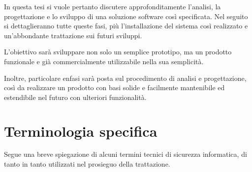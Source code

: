 In questa tesi si vuole pertanto discutere approfonditamente l'analisi, la progettazione e lo sviluppo di una soluzione software così specificata.
Nel seguito si dettaglieranno tutte queste fasi, più l'installazione del sistema così realizzato e un'abbondante trattazione sui futuri sviluppi.

L'obiettivo sarà sviluppare non solo un semplice prototipo, ma un prodotto funzionale e già commercialmente utilizzabile nella sua semplicità.

Inoltre, particolare enfasi sarà posta sul procedimento di analisi e progettazione, così da realizzare un prodotto con basi solide e facilmente mantenibile ed estendibile nel futuro con ulteriori funzionalità.

\section{Terminologia specifica}
Segue una breve spiegazione di alcuni termini tecnici di sicurezza informatica, di tanto in tanto utilizzati nel prosieguo della trattazione.

